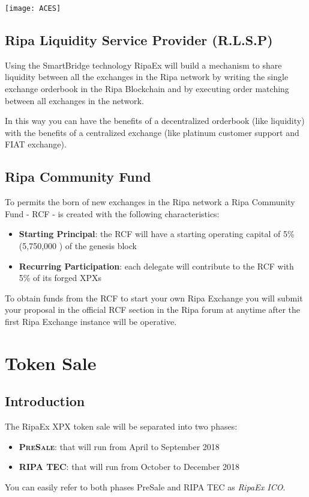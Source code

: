 \documentclass[11pt,fleqn,oneside]{book} %
\begin{document}
\begin{center}
	\texttt{[image: ACES]}
\end{center}

\section{Ripa Liquidity Service Provider (R.L.S.P)}
Using the SmartBridge technology RipaEx will build a mechanism to share liquidity between all the exchanges in the Ripa network
by writing the single exchange orderbook in the Ripa Blockchain and by executing order matching between all exchanges in the network.

In this way you can have the benefits of a decentralized orderbook (like liquidity) with the benefits of a centralized exchange (like
platinum customer support and FIAT exchange).

\section{Ripa Community Fund}
To permits the born of new exchanges in the Ripa network a Ripa Community Fund - RCF - is created with the following characteristics:
\begin{itemize}
	\item \textbf{Starting Principal}: the RCF will have a starting operating capital of 5\% (5,750,000 \PHP) of the genesis block
	\item \textbf{Recurring Participation}: each delegate will contribute to the RCF with 5\% of its forged XPXs
\end{itemize}
\vspace{5mm}
To obtain funds from the RCF to start your own Ripa Exchange you will submit your proposal in the official RCF section in the Ripa forum at
anytime after the first Ripa Exchange instance will be operative.


\chapter{Token Sale}
\section{Introduction}
The RipaEx XPX token sale will be separated into two phases:
	\begin{itemize}
		\item \textbf{\textsc{PreSale}}: that will run from April to September 2018
		\item \textbf{\textsc{RIPA TEC}}: that will run from October to December 2018
	\end{itemize}
\vspace{5mm}
You can easily refer to both phases PreSale and RIPA TEC as \textit{RipaEx ICO}.
\end{document}
